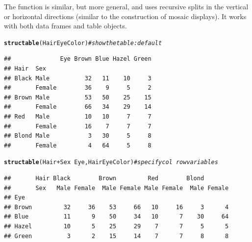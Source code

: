 \documentclass[11pt]{book}\usepackage[]{graphicx}\usepackage[]{color}
\makeatletter
\newcommand{\hlcom}[1]{\textcolor[rgb]{0.678,0.584,0.686}{\textit{#1}}}%
\newcommand{\hlopt}[1]{\textcolor[rgb]{0,0,0}{#1}}%
\newcommand{\hlstd}[1]{\textcolor[rgb]{0.345,0.345,0.345}{#1}}%
\newcommand{\hlkwd}[1]{\textcolor[rgb]{0.737,0.353,0.396}{\textbf{#1}}}%
\newenvironment{kframe}{%
 \def\at@end@of@kframe{}%
 \ifinner\ifhmode%
  \def\at@end@of@kframe{\end{minipage}}%
  \begin{minipage}{\columnwidth}%
 \fi\fi%
 \def\FrameCommand##1{\hskip\@totalleftmargin \hskip-\fboxsep
 \colorbox{shadecolor}{##1}\hskip-\fboxsep
     \hskip-\linewidth \hskip-\@totalleftmargin \hskip\columnwidth}%
 \MakeFramed {\advance\hsize-\width
   \@totalleftmargin\z@ \linewidth\hsize
   \@setminipage}}%
 {\par\unskip\endMakeFramed%
 \at@end@of@kframe}
\newenvironment{knitrout}{}{} %
\renewenvironment{knitrout}{\small\renewcommand{\baselinestretch}{.85}}{} %
\makeatother
\begin{document}
The  function is similar, but more general, and uses
recursive splits in the vertical or horizontal directions
(similar to the construction of mosaic displays).  It works with both
data frames and table objects.
\begin{knitrout}
\color{fgcolor}\begin{kframe}
\begin{alltt}
\hlkwd{structable}\hlstd{(HairEyeColor)}                   \hlcom{# show the table: default}
\end{alltt}
\begin{verbatim}
##              Eye Brown Blue Hazel Green
## Hair  Sex                              
## Black Male          32   11    10     3
##       Female        36    9     5     2
## Brown Male          53   50    25    15
##       Female        66   34    29    14
## Red   Male          10   10     7     7
##       Female        16    7     7     7
## Blond Male           3   30     5     8
##       Female         4   64     5     8
\end{verbatim}
\begin{alltt}
\hlkwd{structable}\hlstd{(Hair}\hlopt{+}\hlstd{Sex} \hlopt{~} \hlstd{Eye, HairEyeColor)}   \hlcom{# specify col ~ row variables}
\end{alltt}
\begin{verbatim}
##       Hair Black        Brown         Red        Blond       
##       Sex   Male Female  Male Female Male Female  Male Female
## Eye                                                          
## Brown         32     36    53     66   10     16     3      4
## Blue          11      9    50     34   10      7    30     64
## Hazel         10      5    25     29    7      7     5      5
## Green          3      2    15     14    7      7     8      8
\end{verbatim}
\end{kframe}
\end{knitrout}
\end{document}
